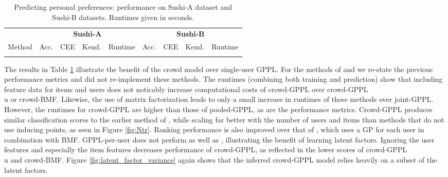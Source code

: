 \begin{table}
\begin{tabularx}{\textwidth}{| l | X | X | X | l | X | X | X | l |}
\hline
& \multicolumn{4}{|c|}{\textbf{Sushi-A}} & \multicolumn{4}{c|}{\textbf{Sushi-B}} \\ 
Method & Acc. & CEE & Kend. & Runtime & Acc. & CEE & Kend. & Runtime \\
\hline\hline
\\ \hline
\end{tabularx}
\caption{Predicting personal preferences: performance on Sushi-A dataset and Sushi-B datasets.
Runtimes given in seconds.}
\label{tab:sushi}
\end{table}
The results in Table \ref{tab:sushi} illustrate the benefit of the crowd model over single-user GPPL. 
For the methods of \citep{houlsby2012collaborative} and \citep{khan2014scalable}
we re-state the previous performance metrics and did not re-implement these methods. 
The runtimes (combining both training and prediction) 
show that including feature data for items and users does not 
noticably increase computational costs of crowd-GPPL over crowd-GPPL\\u or crowd-BMF.
Likewise, the use of matrix factorization leads to only a small increase in
 runtimes of these methods over joint-GPPL. 
 However, the runtimes for crowd-GPPL are higher than those of pooled-GPPL,
 as are the performance metrics. 
Crowd-GPPL produces similar classification scores to the earlier method of 
 \citep{houlsby2012collaborative}, while scaling far better with the number of users and items
 than methods that do not use inducing points, as seen in Figure \ref{fig:Ntr}.
Ranking performance is also improved over that of \citep{khan2014scalable}, which
uses a GP for each user in combination with BMF. 
GPPL-per-user does not perform as well as \citep{khan2014scalable}, illustrating the benefit 
of learning latent factors.
Ignoring the user features and especially the item features decreases performance of crowd-GPPL, 
as reflected in the lower scores of crowd-GPPL\\u and crowd-BMF.
Figure \ref{fig:latent_factor_variance} again shows that the inferred crowd-GPPL model relies
heavily on a subset of the latent factors.
